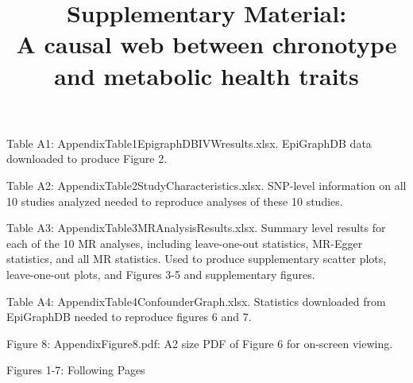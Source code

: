 \documentclass{article}
\title{{\bf Supplementary Material:} \\A causal web between chronotype and metabolic health traits}
\author{}
\date{}
\begin{document}
\maketitle

Table A1: AppendixTable1EpigraphDBIVWresults.xlsx. EpiGraphDB data downloaded to produce Figure 2.

Table A2: AppendixTable2StudyCharacteristics.xlsx.
SNP-level information on all 10 studies analyzed needed to reproduce analyses of these 10 studies.

Table A3: AppendixTable3MRAnalysisResults.xlsx. Summary level results for each of the 10 MR analyses, including leave-one-out statistics, MR-Egger statistics, and all MR statistics. Used to produce supplementary scatter plots, leave-one-out plots, and Figures 3-5 and supplementary figures. 

Table A4: AppendixTable4ConfounderGraph.xlsx.
Statistics downloaded from EpiGraphDB needed to reproduce figures 6 and 7.

Figure 8: AppendixFigure8.pdf: A2 size PDF of Figure 6 for on-screen viewing.

Figures 1-7: Following Pages
 
\end{document}
